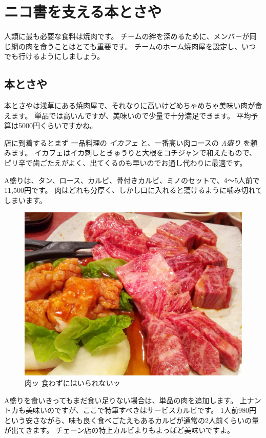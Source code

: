 \section{ニコ書を支える本とさや}

人類に最も必要な食料は焼肉です。
チームの絆を深めるために、メンバーが同じ網の肉を食うことはとても重要です。
チームのホーム焼肉屋を設定し、いつでも行けるようにしましょう。

\subsection{本とさや}

本とさやは浅草にある焼肉屋で、それなりに高いけどめちゃめちゃ美味い肉が食えます。
単品では高いんですが、美味いので少量で十分満足できます。
平均予算は5000円くらいですかね。

店に到着するとまず 一品料理の \emph{イカフェ} と、一番高い肉コースの
\emph{A盛り} を頼みます。
イカフェはイカ刺しときゅうりと大根をコチジャンで和えたもので、
ピリ辛で歯ごたえがよく、出てくるのも早いのでお通し代わりに最適です。

A盛りは、タン、ロース、カルビ、骨付きカルビ、ミノのセットで、4〜5人前で11,500円です。
肉はどれも分厚く、しかし口に入れると蕩けるように噛み切れてしまいます。

\begin{figure}[H]
\centering
\includegraphics[width=\textwidth]{../images/hontosaya.jpg}
\caption{肉ッ 食わずにはいられないッ}
\end{figure}

A盛りを食いきってもまだ食い足りない場合は、単品の肉を追加します。
上ナントカも美味いのですが、ここで特筆すべきはサービスカルビです。
1人前980円という安さながら、味も良く食べごたえもあるカルビが通常の2人前くらいの量が出てきます。
チェーン店の特上カルビよりもよっぽど美味いですよ。

